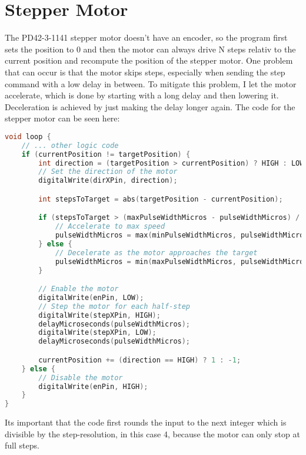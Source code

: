\section{Stepper Motor}\label{sec:stepper-motor}
The PD42-3-1141 stepper motor doesn't have an encoder, so the program first sets the position to 0 and then the motor can always drive N steps relativ to the current position and recompute the position of the stepper motor.
One problem that can occur is that the motor skips steps, especially when sending the step command with a low delay in between.
To mitigate this problem, I let the motor accelerate, which is done by starting with a long delay and then lowering it.
Deceleration is achieved by just making the delay longer again.
The code for the stepper motor can be seen here:
\begin{lstlisting}[language=cpp,breaklines,label={lst:stepper-motor}]
void loop {
    // ... other logic code
    if (currentPosition != targetPosition) {
        int direction = (targetPosition > currentPosition) ? HIGH : LOW;
        // Set the direction of the motor
        digitalWrite(dirXPin, direction);

        int stepsToTarget = abs(targetPosition - currentPosition);

        if (stepsToTarget > (maxPulseWidthMicros - pulseWidthMicros) / acc) {
            // Accelerate to max speed
            pulseWidthMicros = max(minPulseWidthMicros, pulseWidthMicros - acc);
        } else {
            // Decelerate as the motor approaches the target
            pulseWidthMicros = min(maxPulseWidthMicros, pulseWidthMicros + acc);
        }

        // Enable the motor
        digitalWrite(enPin, LOW);
        // Step the motor for each half-step
        digitalWrite(stepXPin, HIGH);
        delayMicroseconds(pulseWidthMicros);
        digitalWrite(stepXPin, LOW);
        delayMicroseconds(pulseWidthMicros);

        currentPosition += (direction == HIGH) ? 1 : -1;
    } else {
        // Disable the motor
        digitalWrite(enPin, HIGH);
    }
}
\end{lstlisting}
Its important that the code first rounds the input to the next integer which is divisible by the step-resolution, in this case 4, because the motor can only stop at full steps.\\
\vspace{0.5cm}\\
